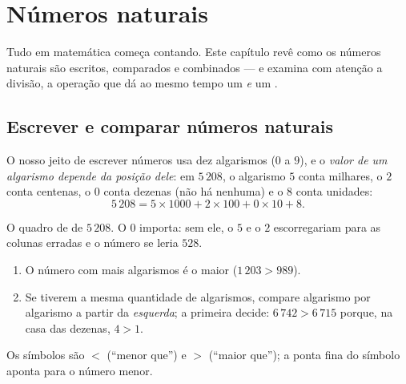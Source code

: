 \chapter{Números naturais}\label{ch:g6:wholes}

Tudo em matemática começa contando. Este capítulo revê como os números
naturais são escritos, comparados e combinados --- e examina com atenção a
divisão, a operação que dá ao mesmo tempo um  \emph{e} um .

\section{Escrever e comparar números naturais}

\begin{definition}\label{def:g6:wholes:place}
O nosso jeito de escrever números usa dez algarismos ($0$ a $9$), e o
\emph{valor de um algarismo depende da posição dele}:
em $5\,208$, o algarismo $5$ conta milhares, o $2$ conta centenas, o $0$
conta dezenas (não há nenhuma) e o $8$ conta unidades:
\[
5\,208 = 5 \times 1000 + 2 \times 100 + 0 \times 10 + 8 .
\]
\end{definition}

\begin{omfigure}

{\small O quadro de  de $5\,208$. O $0$ importa: sem ele,
o $5$ e o $2$ escorregariam para as colunas erradas e o número se leria
$528$.}
\end{omfigure}

\begin{method}\label{met:g6:wholes:compare}
\begin{enumerate}
  \item O número com mais algarismos é o maior
        ($1\,203 > 989$).
  \item Se tiverem a mesma quantidade de algarismos, compare algarismo por
        algarismo a partir da \emph{esquerda}; a primeira 
        decide: $6\,742 > 6\,715$ porque, na casa das dezenas, $4 > 1$.
\end{enumerate}
Os símbolos são $<$ (``menor que'') e $>$ (``maior que''); a ponta fina do
símbolo aponta para o número menor.
\end{method}

